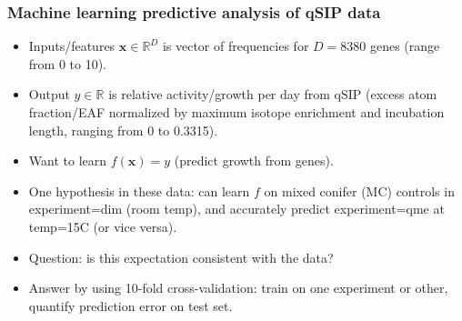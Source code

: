 \documentclass{beamer}
\begin{document}
\begin{frame}
  \frametitle{Machine learning predictive analysis of qSIP data}
  \begin{itemize}
  \item Inputs/features $\mathbf x\in\mathbb R^D$ is vector of frequencies for $D=8380$ genes
    (range from 0 to 10).
  \item Output $y\in\mathbb R$ is relative activity/growth per day
    from qSIP (excess atom fraction/EAF normalized by maximum isotope enrichment
    and incubation length, ranging from 0 to 0.3315).
  \item Want to learn $ f(\mathbf x)=y$ (predict growth from genes).
  \item One hypothesis in these data: can learn $f$ on mixed conifer (MC) controls in experiment=dim (room temp), and accurately predict experiment=qme at temp=15C (or vice versa). 
  \item Question: is this expectation consistent with the data?
  \item Answer by using 10-fold cross-validation: train on one experiment or other, quantify prediction error on test set.
  \end{itemize}
\end{frame}
\end{document}
